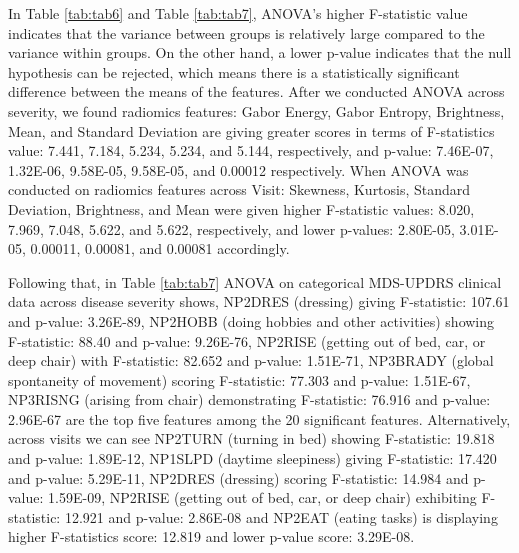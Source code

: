 \documentclass{article}
\begin{document}
In Table \ref{tab:tab6} and Table \ref{tab:tab7}, ANOVA’s higher F-statistic value indicates that the variance between groups is relatively large compared to the variance within groups. On the other hand, a lower p-value indicates that the null hypothesis can be rejected, which means there is a statistically significant difference between the means of the features. After we conducted ANOVA across severity, we found radiomics features: Gabor Energy, Gabor Entropy, Brightness, Mean, and Standard Deviation are giving greater scores in terms of F-statistics value: 7.441, 7.184, 5.234, 5.234, and 5.144, respectively, and p-value: 7.46E-07, 1.32E-06, 9.58E-05, 9.58E-05, and 0.00012 respectively. When ANOVA was conducted on radiomics features across Visit: Skewness, Kurtosis, Standard Deviation, Brightness, and Mean were given higher F-statistic values: 8.020, 7.969, 7.048, 5.622, and 5.622, respectively, and lower p-values: 2.80E-05, 3.01E-05, 0.00011, 0.00081, and 0.00081 accordingly.

Following that, in Table \ref{tab:tab7} ANOVA on categorical MDS-UPDRS clinical data across disease severity shows, NP2DRES (dressing) giving F-statistic: 107.61 and p-value: 3.26E-89, NP2HOBB (doing hobbies and other activities) showing F-statistic: 88.40 and p-value: 9.26E-76, NP2RISE (getting out of bed, car, or deep chair) with F-statistic: 82.652 and p-value: 1.51E-71, NP3BRADY (global spontaneity of movement) scoring F-statistic: 77.303 and p-value: 1.51E-67, NP3RISNG (arising from chair) demonstrating F-statistic: 76.916 and p-value: 2.96E-67 are the top five features among the 20 significant features. Alternatively, across visits we can see NP2TURN (turning in bed) showing F-statistic: 19.818 and p-value: 1.89E-12, NP1SLPD (daytime sleepiness) giving F-statistic: 17.420 and p-value: 5.29E-11, NP2DRES (dressing) scoring F-statistic: 14.984 and p-value: 1.59E-09, NP2RISE (getting out of bed, car, or deep chair) exhibiting F-statistic: 12.921 and p-value: 2.86E-08 and NP2EAT (eating tasks) is displaying higher F-statistics score: 12.819 and lower p-value score: 3.29E-08.
\end{document}
